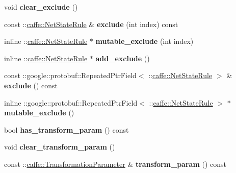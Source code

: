 \begin{DoxyCompactItemize}
void {\bfseries clear\+\_\+exclude} ()
\item 
\mbox{\label{classcaffe_1_1_layer_parameter_af89f7b49f99a1fba6816de0899c6d244}} 
const \+::\mbox{\hyperlink{classcaffe_1_1_net_state_rule}{caffe\+::\+Net\+State\+Rule}} \& {\bfseries exclude} (int index) const
\item 
\mbox{\label{classcaffe_1_1_layer_parameter_a023ce50d525d7f3ba6d104c029e6c400}} 
inline \+::\mbox{\hyperlink{classcaffe_1_1_net_state_rule}{caffe\+::\+Net\+State\+Rule}} $\ast$ {\bfseries mutable\+\_\+exclude} (int index)
\item 
\mbox{\label{classcaffe_1_1_layer_parameter_a288111236f39c7eea5ef35c34cc18e53}} 
inline \+::\mbox{\hyperlink{classcaffe_1_1_net_state_rule}{caffe\+::\+Net\+State\+Rule}} $\ast$ {\bfseries add\+\_\+exclude} ()
\item 
\mbox{\label{classcaffe_1_1_layer_parameter_a904ee52b4424a60af4d7d4d7d7192140}} 
const \+::google\+::protobuf\+::\+Repeated\+Ptr\+Field$<$ \+::\mbox{\hyperlink{classcaffe_1_1_net_state_rule}{caffe\+::\+Net\+State\+Rule}} $>$ \& {\bfseries exclude} () const
\item 
\mbox{\label{classcaffe_1_1_layer_parameter_ab7d6250e30435b7c8c8ce67ef82d428c}} 
inline \+::google\+::protobuf\+::\+Repeated\+Ptr\+Field$<$ \+::\mbox{\hyperlink{classcaffe_1_1_net_state_rule}{caffe\+::\+Net\+State\+Rule}} $>$ $\ast$ {\bfseries mutable\+\_\+exclude} ()
\item 
\mbox{\label{classcaffe_1_1_layer_parameter_af9c26d652e4c8d7574ca29e4f8a40ff0}} 
bool {\bfseries has\+\_\+transform\+\_\+param} () const
\item 
\mbox{\label{classcaffe_1_1_layer_parameter_a4d6d3b5066a0b263bc7675367b3c63dd}} 
void {\bfseries clear\+\_\+transform\+\_\+param} ()
\item 
\mbox{\label{classcaffe_1_1_layer_parameter_aec3d3e69da7ff421a8e32bc4f76d2e1a}} 
const \+::\mbox{\hyperlink{classcaffe_1_1_transformation_parameter}{caffe\+::\+Transformation\+Parameter}} \& {\bfseries transform\+\_\+param} () const

\end{DoxyCompactItemize}
